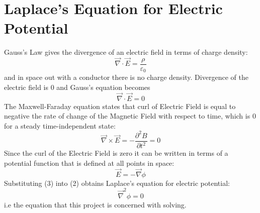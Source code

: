 \documentclass{article}
\begin{document}
\section{Laplace's Equation for Electric Potential}
Gauss's Law gives the divergence of an electric field in terms of charge density: 
\begin{equation}
\vec{\nabla} \cdot \vec{E} = \frac{\rho}{\varepsilon_{0}}
\label{1}
\end{equation}
and in space out with a conductor there is no charge density.  Divergence of the electric field is 0 and Gauss's equation becomes
\begin{equation}
\vec{\nabla} \cdot \vec{E} =0
\label{2}
\end{equation}
The Maxwell-Faraday equation states that curl of Electric Field is equal to negative the rate of change of the Magnetic Field with respect to time, which is 0 for a steady time-independent state:
\begin{equation}
\vec{\nabla}\times\vec{E} = -\frac{\partial^2{B}}{\partial{t}^2} = 0
\label{3}
\end{equation}
Since the curl of the Electric Field is zero it can be written in terms of a potential function \phi\) that is defined at all points in space:
\begin{equation}
\vec{E} = -\vec{\nabla}\phi
\label{3}
\end{equation}
Substituting (3) into (2) obtains Laplace's equation for electric potential:
\begin{equation}
\vec{\nabla}^2\phi = 0
\label{5}
\end{equation}
i.e the equation that this project is concerned with solving.
\end{document}
